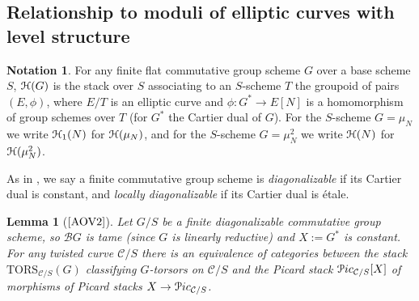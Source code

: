 \documentclass[11pt]{amsart}
\newtheorem{lemma}[subsection]{Lemma}
\theoremstyle{definition}
\newtheorem{notation}[subsection]{Notation}
\begin{document}
\subsection*{Relationship to moduli of elliptic curves with level structure}

\begin{notation}
For any finite flat commutative group scheme $G$ over a base scheme $S$, ${\mathbf{\EuScript{H}}}(G)$ is the stack over $S$ associating to an $S$-scheme $T$ the groupoid of pairs $(E,\phi)$, where $E/T$ is an elliptic curve and $\phi: G^* \rightarrow E[N]$ is a homomorphism of group schemes over $T$ (for $G^*$ the Cartier dual of $G$). For the $S$-scheme $G=\mu_N$ we write ${\mathbf{\EuScript{H}}}_1(N)$ for ${\mathbf{\EuScript{H}}}(\mu_N)$, and for the $S$-scheme $G = \mu_N^2$ we write ${\mathbf{\EuScript{H}}}(N)$ for ${\mathbf{\EuScript{H}}}(\mu_N^2)$. 
\end{notation}

As in \cite[\S2.3]{AOV1}, we say a finite commutative group scheme is \textit{diagonalizable} if its Cartier dual is constant, and \textit{locally diagonalizable} if its Cartier dual is \'etale. 

\begin{lemma}[$\textrm{\cite[5.7]{AOV2}}$]\label{bigpicard}
Let $G/S$ be a finite diagonalizable commutative group scheme, so ${\mathcal{B}} G$ is tame (since $G$ is linearly reductive) and $X := G^*$ is constant. For any twisted curve ${\mathcal{C}}/S$ there is an equivalence of categories between the stack $\mathrm{TORS}_{{\mathcal{C}}/S}(G)$ classifying $G$-torsors on ${\mathcal{C}}/S$ and the Picard stack ${\mathbf{\EuScript{P}}}ic_{{\mathcal{C}}/S}[X]$ of morphisms of Picard stacks $X \rightarrow {\mathbf{\EuScript{P}}}ic_{{\mathcal{C}}/S}$. 
\end{lemma}
\end{document}
